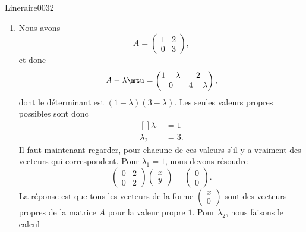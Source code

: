 \begin{corrige}{Lineraire0032}

	\begin{enumerate}

		\item
	Nous avons
	\begin{equation}
		A=\begin{pmatrix}
			1	&	2	\\ 
			0	&	3	
		\end{pmatrix},
	\end{equation}
	et donc
	\begin{equation}
		A-\lambda\mtu=\begin{pmatrix}
			1-\lambda	&	2	\\ 
			0	&	4-\lambda	
		\end{pmatrix},
	\end{equation}
	dont le déterminant est $(1-\lambda)(3-\lambda)$. Les seules valeurs propres possibles sont donc
	\begin{equation}
		\begin{aligned}[]
			\lambda_1&=1\\
			\lambda_2&=3.
		\end{aligned}
	\end{equation}
	Il faut maintenant regarder, pour chacune de ces valeurs s'il y a vraiment des vecteurs qui correspondent. Pour $\lambda_1=1$, nous devons résoudre
	\begin{equation}
		\begin{pmatrix}
			0	&	2	\\ 
			0	&	2	
		\end{pmatrix}\begin{pmatrix}
			x	\\ 
			y	
		\end{pmatrix}=\begin{pmatrix}
			0	\\ 
			0	
		\end{pmatrix}.
	\end{equation}
	La réponse est que tous les vecteurs de la forme $\begin{pmatrix}
		x	\\ 
		0	
	\end{pmatrix}$ sont des vecteurs propres de la matrice $A$ pour la valeur propre $1$. Pour $\lambda_2$, nous faisons le calcul
	\begin{equation}

\end{equation}
\end{enumerate}
\end{corrige}
